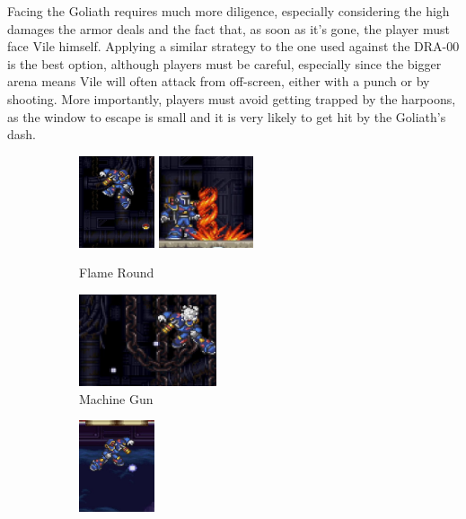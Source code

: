 Facing the Goliath requires much more diligence, especially considering the high damages the armor deals and the fact that, as soon as it's gone, the player must face Vile himself. Applying a similar strategy to the one used against the DRA-00 is the best option, although players must be careful, especially since the bigger arena means Vile will often attack from off-screen, either with a punch or by shooting. More importantly, players must avoid getting trapped by the harpoons, as the window to escape is small and it is very likely to get hit by the Goliath's dash.
\begin{figure}[htp]
	\centering
	\begin{subfigure}{.45\linewidth}
		\centering
		\includegraphics[height=2.7cm]{figures/X3/Doppler_stages/vile_bomb_1.jpg}
		\includegraphics[height=2.7cm]{figures/X3/Doppler_stages/vile_bomb_2.jpg}
		\caption{Flame Round}
	\end{subfigure}
	\begin{subfigure}{.4\linewidth}
		\centering
		\includegraphics[height=2.7cm]{figures/X3/Doppler_stages/vile_gatling.jpg}
		\caption{Machine Gun}
	\end{subfigure}
	\begin{subfigure}{\linewidth}
		\centering
		\includegraphics[height=2.7cm]{figures/X3/Doppler_stages/vile_par_1.jpg}

\end{subfigure}
\end{figure}
